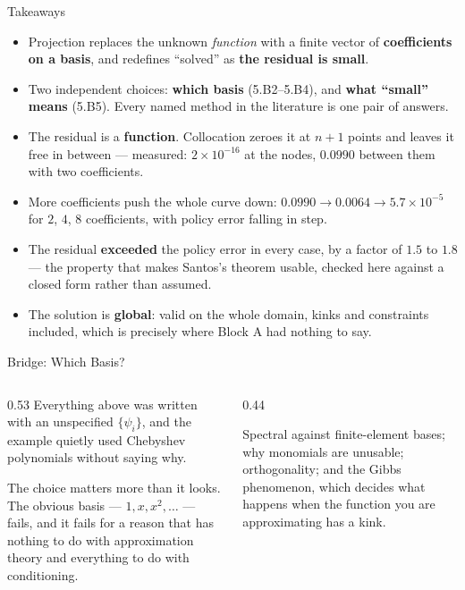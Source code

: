\begin{frame}{Takeaways}
\begin{takeawaybox}
\begin{itemize}\small
  \item Projection replaces the unknown \emph{function} with a finite vector of \textbf{coefficients on a basis}, and redefines ``solved'' as \textbf{the residual is small}.
  \item Two independent choices: \textbf{which basis} (5.B2--5.B4), and \textbf{what ``small'' means} (5.B5). Every named method in the literature is one pair of answers.
  \item The residual is a \textbf{function}. Collocation zeroes it at $n+1$ points and leaves it free in between --- measured: $2\times10^{-16}$ at the nodes, $0.0990$ between them with two coefficients.
  \item More coefficients push the whole curve down: $0.0990 \to 0.0064 \to 5.7\times10^{-5}$ for $2$, $4$, $8$ coefficients, with policy error falling in step.
  \item The residual \textbf{exceeded} the policy error in every case, by a factor of $1.5$ to $1.8$ --- the property that makes Santos's theorem usable, checked here against a closed form rather than assumed.
  \item The solution is \textbf{global}: valid on the whole domain, kinks and constraints included, which is precisely where Block A had nothing to say.
\end{itemize}
\end{takeawaybox}
\end{frame}

\begin{frame}{Bridge: Which Basis?}
\begin{columns}[T]
\begin{column}{0.53\textwidth}
\small
Everything above was written with an unspecified $\{\psi_i\}$, and the example quietly used Chebyshev polynomials without saying why.
\medskip

The choice matters more than it looks. The obvious basis --- $1,x,x^{2},\dots$ --- fails, and it fails for a reason that has nothing to do with approximation theory and everything to do with conditioning.
\end{column}
\begin{column}{0.44\textwidth}
\begin{conceptbox}[title=\textbf{Next (5.B2)}]\small
Spectral against finite-element bases; why monomials are unusable; orthogonality; and the Gibbs phenomenon, which decides what happens when the function you are approximating has a kink.
\end{conceptbox}
\end{column}
\end{columns}
\end{frame}


